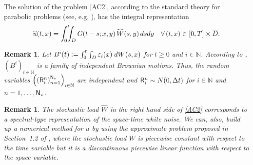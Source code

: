 \documentclass[10pt]{amsart}
\newtheorem{remark}[remm]{Remark}
\numberwithin{equation}{section}
\begin{document}
The solution of the problem \eqref{AC2}, according to the standard
theory for parabolic problems (see, e.g, \cite{LMag}), has the
integral representation
\begin{equation}\label{HatUform}
\widehat{u}(t,x)= \int_0^t\!\!\!\int_{{\scriptscriptstyle} D} G(t-s;x,y)
\,{\widehat W}(s,y)\,dsdy
\quad\forall\,(t,x)\in[0,T]\times{\overline D}.
\end{equation}
\begin{remark}
Let $B^i(t):=\int_0^t\int_{{\scriptscriptstyle} D}\varepsilon_i(x)\;dW(s,x)$
for $t\ge0$ and $i\in{\mathbb N}$. According to \cite{Walsh86},
$(B^i)_{i\in{\mathbb N}}$ is a family of independent Brownian motions.
Thus, the random variables $\left(\left({\sf R}^n_i\right)_{n=1}^{{\scriptscriptstyle} {\sf N}_{\star}}\right)_{i\in{\mathbb N}}$
are independent and ${\sf R}^n_i\sim N(0,\Delta{t})$ for $i\in{\mathbb N}$ and $n=1,\dots,{\sf N}_{\star}$.
\end{remark}
\begin{remark}
The stochastic load ${\widehat W}$ in the right hand side of \eqref{AC2} corresponds
to a spectral-type representation of the space-time white noise.
We can, also, build up a numerical method for $u$ by using the approximate problem
proposed in Section~1.2 of \cite{KZ2010}, where 
the stochastic load ${\widehat W}$ is piecewise constant with respect to the time
variable but it is a discontinuous piecewise linear function with respect to the space variable. 
\end{remark}
\end{document}
